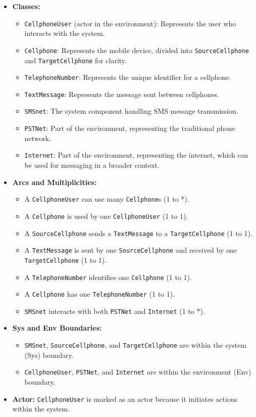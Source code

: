 \documentclass{article}
\begin{document}
\begin{itemize}
    \item \textbf{Classes:}
    \begin{itemize}
        \item \texttt{CellphoneUser} (actor in the environment): Represents the user who interacts with the system.
        \item \texttt{Cellphone}: Represents the mobile device, divided into \texttt{SourceCellphone} and \texttt{TargetCellphone} for clarity.
        \item \texttt{TelephoneNumber}: Represents the unique identifier for a cellphone.
        \item \texttt{TextMessage}: Represents the message sent between cellphones.
        \item \texttt{SMSnet}: The system component handling SMS message transmission.
        \item \texttt{PSTNet}: Part of the environment, representing the traditional phone network.
        \item \texttt{Internet}: Part of the environment, representing the internet, which can be used for messaging in a broader context.
    \end{itemize}
    \item \textbf{Arcs and Multiplicities:}
    \begin{itemize}
        \item A \texttt{CellphoneUser} can use many \texttt{Cellphone}s (1 to *).
        \item A \texttt{Cellphone} is used by one \texttt{CellphoneUser} (1 to 1).
        \item A \texttt{SourceCellphone} sends a \texttt{TextMessage} to a \texttt{TargetCellphone} (1 to 1).
        \item A \texttt{TextMessage} is sent by one \texttt{SourceCellphone} and received by one \texttt{TargetCellphone} (1 to 1).
        \item A \texttt{TelephoneNumber} identifies one \texttt{Cellphone} (1 to 1).
        \item A \texttt{Cellphone} has one \texttt{TelephoneNumber} (1 to 1).
        \item \texttt{SMSnet} interacts with both \texttt{PSTNet} and \texttt{Internet} (1 to *).
    \end{itemize}
    \item \textbf{Sys and Env Boundaries:}
    \begin{itemize}
        \item \texttt{SMSnet}, \texttt{SourceCellphone}, and \texttt{TargetCellphone} are within the system (Sys) boundary.
        \item \texttt{CellphoneUser}, \texttt{PSTNet}, and \texttt{Internet} are within the environment (Env) boundary.
    \end{itemize}
    \item \textbf{Actor:} \texttt{CellphoneUser} is marked as an actor because it initiates actions within the system.
\end{itemize}
\end{document}
